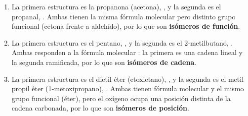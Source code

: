 \begin{exerciseEVAU}
\begin{solu}
\begin{enumerate}[label=\letraminuscula]
            \item La primera estructura es la propanona (acetona), , y la segunda es el propanal, . Ambas tienen la misma fórmula molecular  pero distinto grupo funcional (cetona frente a aldehído), por lo que son \textbf{isómeros de función}.

            \item La primera estructura es el pentano, , y la segunda es el 2-metilbutano, . Ambas responden a la fórmula molecular : la primera es una cadena lineal y la segunda ramificada, por lo que son \textbf{isómeros de cadena}.

            \item La primera estructura es el dietil éter (etoxietano), , y la segunda es el metil propil éter (1-metoxipropano), . Ambas tienen fórmula molecular  y el mismo grupo funcional (éter), pero el oxígeno ocupa una posición distinta de la cadena carbonada, por lo que son \textbf{isómeros de posición}.
        \end{enumerate}
    \end{solu}
\end{exerciseEVAU}


